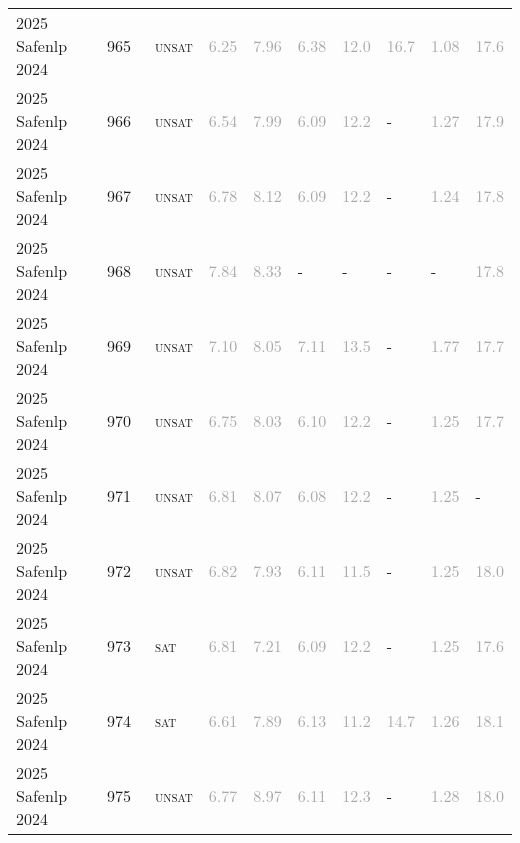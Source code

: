 \begin{center}
{\begin{longtable}{@{}llllllllll@{}}
2025 Safenlp 2024 & 965 & ~\textsc{unsat} & \textcolor{darkgray}{6.25} & \textcolor{darkgray}{7.96} & \textcolor{darkgray}{6.38} & \textcolor{darkgray}{12.0} & \textcolor{darkgray}{16.7} & \textcolor{darkgray}{1.08} & \textcolor{darkgray}{17.6} \\
2025 Safenlp 2024 & 966 & ~\textsc{unsat} & \textcolor{darkgray}{6.54} & \textcolor{darkgray}{7.99} & \textcolor{darkgray}{6.09} & \textcolor{darkgray}{12.2} & - & \textcolor{darkgray}{1.27} & \textcolor{darkgray}{17.9} \\
2025 Safenlp 2024 & 967 & ~\textsc{unsat} & \textcolor{darkgray}{6.78} & \textcolor{darkgray}{8.12} & \textcolor{darkgray}{6.09} & \textcolor{darkgray}{12.2} & - & \textcolor{darkgray}{1.24} & \textcolor{darkgray}{17.8} \\
2025 Safenlp 2024 & 968 & ~\textsc{unsat} & \textcolor{darkgray}{7.84} & \textcolor{darkgray}{8.33} & - & - & - & - & \textcolor{darkgray}{17.8} \\
2025 Safenlp 2024 & 969 & ~\textsc{unsat} & \textcolor{darkgray}{7.10} & \textcolor{darkgray}{8.05} & \textcolor{darkgray}{7.11} & \textcolor{darkgray}{13.5} & - & \textcolor{darkgray}{1.77} & \textcolor{darkgray}{17.7} \\
2025 Safenlp 2024 & 970 & ~\textsc{unsat} & \textcolor{darkgray}{6.75} & \textcolor{darkgray}{8.03} & \textcolor{darkgray}{6.10} & \textcolor{darkgray}{12.2} & - & \textcolor{darkgray}{1.25} & \textcolor{darkgray}{17.7} \\
2025 Safenlp 2024 & 971 & ~\textsc{unsat} & \textcolor{darkgray}{6.81} & \textcolor{darkgray}{8.07} & \textcolor{darkgray}{6.08} & \textcolor{darkgray}{12.2} & - & \textcolor{darkgray}{1.25} & - \\
2025 Safenlp 2024 & 972 & ~\textsc{unsat} & \textcolor{darkgray}{6.82} & \textcolor{darkgray}{7.93} & \textcolor{darkgray}{6.11} & \textcolor{darkgray}{11.5} & - & \textcolor{darkgray}{1.25} & \textcolor{darkgray}{18.0} \\
2025 Safenlp 2024 & 973 & ~\textsc{sat} & \textcolor{darkgray}{6.81} & \textcolor{darkgray}{7.21} & \textcolor{darkgray}{6.09} & \textcolor{darkgray}{12.2} & - & \textcolor{darkgray}{1.25} & \textcolor{darkgray}{17.6} \\
2025 Safenlp 2024 & 974 & ~\textsc{sat} & \textcolor{darkgray}{6.61} & \textcolor{darkgray}{7.89} & \textcolor{darkgray}{6.13} & \textcolor{darkgray}{11.2} & \textcolor{darkgray}{14.7} & \textcolor{darkgray}{1.26} & \textcolor{darkgray}{18.1} \\
2025 Safenlp 2024 & 975 & ~\textsc{unsat} & \textcolor{darkgray}{6.77} & \textcolor{darkgray}{8.97} & \textcolor{darkgray}{6.11} & \textcolor{darkgray}{12.3} & - & \textcolor{darkgray}{1.28} & \textcolor{darkgray}{18.0} \\

\end{longtable}}
\end{center}
